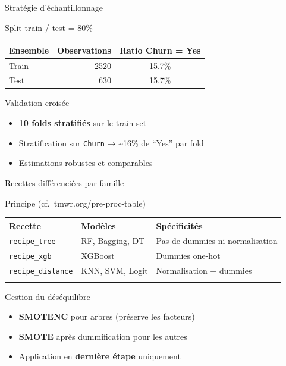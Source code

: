\documentclass[
  10pt,
  ignorenonframetext,
  aspectratio=169,
]{beamer}
\providecommand{\tightlist}{%
  \setlength{\itemsep}{0pt}\setlength{\parskip}{0pt}}\usepackage{longtable,booktabs,array}
\begin{document}
\begin{frame}[fragile]{Stratégie d'échantillonnage}
\label{stratuxe9gie-duxe9chantillonnage}
\begin{block}{Split train / test = 80\%}
\label{split-train-test-80}
\begingroup\fontsize{9}{11}\selectfont

\begin{longtable*}[t]{lrc}
\toprule
Ensemble & Observations & Ratio Churn = Yes\\
\midrule
Train & 2520 & 15.7\%\\
Test & 630 & 15.7\%\\
\bottomrule
\end{longtable*}
\endgroup{}
\end{block}

\begin{block}{Validation croisée}
\label{validation-croisuxe9e}
\begin{itemize}
\tightlist
\item
  \textbf{10 folds stratifiés} sur le train set
\item
  Stratification sur \texttt{Churn} → \textasciitilde16\% de ``Yes'' par
  fold
\item
  Estimations robustes et comparables
\end{itemize}
\end{block}
\end{frame}

\begin{frame}[fragile]{Recettes différenciées par famille}
\label{recettes-diffuxe9renciuxe9es-par-famille}
\begin{block}{Principe (cf.~tmwr.org/pre-proc-table)}
\label{principe-cf.-tmwr.orgpre-proc-table}
\begin{longtable}[]{@{}lll@{}}
\toprule\noalign{}
Recette & Modèles & Spécificités \\
\midrule\noalign{}
\endhead
\texttt{recipe\_tree} & RF, Bagging, DT & Pas de dummies ni
normalisation \\
\texttt{recipe\_xgb} & XGBoost & Dummies one-hot \\
\texttt{recipe\_distance} & KNN, SVM, Logit & Normalisation + dummies \\
\bottomrule\noalign{}
\end{longtable}
\end{block}

\begin{block}{Gestion du déséquilibre}
\label{gestion-du-duxe9suxe9quilibre}
\begin{itemize}
\tightlist
\item
  \textbf{SMOTENC} pour arbres (préserve les facteurs)
\item
  \textbf{SMOTE} après dummification pour les autres
\item
  Application en \textbf{dernière étape} uniquement
\end{itemize}
\end{block}
\end{frame}
\end{document}
